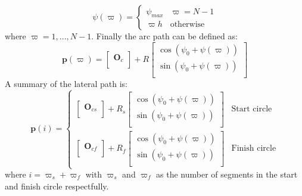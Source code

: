 \begin{equation}
\psi(\varpi) = \begin{cases}
\psi_{max} & \varpi = N-1 \\
\varpi h & \text{otherwise}
\end{cases}
\end{equation}
where $\varpi = 1,...,N-1$. Finally the arc path can be defined as:
\begin{equation}
\mathbf{p}(\varpi) = \begin{bmatrix}
\mathbf{O}_c \\
\end{bmatrix} + R\begin{bmatrix}
\cos(\psi_0 + \psi(\varpi)) \\
\sin(\psi_0 + \psi(\varpi)) \\
\end{bmatrix}
\end{equation}
A summary of the lateral path is:
\begin{equation}
\mathbf{p}(i) = \begin{cases}
\begin{bmatrix}
\mathbf{O}_{cs} \\
\end{bmatrix} + R_s\begin{bmatrix}
\cos(\psi_{0} + \psi(\varpi)) \\
\sin(\psi_{0} + \psi(\varpi)) \\
\end{bmatrix} & \text{Start circle} \\
\begin{bmatrix}
\mathbf{O}_{cf} \\
\end{bmatrix} + R_f\begin{bmatrix}
\cos(\psi_{0} + \psi(\varpi)) \\
\sin(\psi_{0} + \psi(\varpi)) \\
\end{bmatrix} & \text{Finish circle}
\end{cases}
\end{equation}
where $i = \varpi_s + \varpi_f$ with $\varpi_s$ and $\varpi_f$ as the number of segments in the start and finish circle respectfully.
